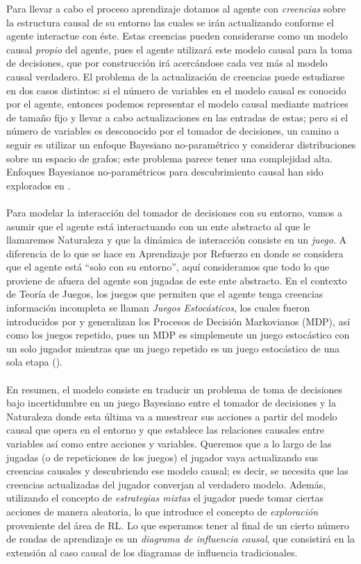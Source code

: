 \documentclass[11pt]{article}
\theoremstyle{plain}
\begin{document}
\indent Para llevar a cabo el proceso aprendizaje dotamos al agente con  \textit{creencias} sobre la estructura causal de su entorno las cuales se irán actualizando conforme el agente interactue con éste. Estas creencias pueden considerarse como un modelo causal \textit{propio} del agente, pues el agente utilizará este modelo causal para la toma de decisiones, que por construcción irá acercándose cada vez más al modelo causal verdadero. El problema de la actualización de creencias puede estudiarse en dos casos distintos: si el número de variables en el modelo causal es conocido por el agente, entonces podemos representar el modelo causal mediante matrices de tamaño fijo y llevar a cabo actualizaciones en las entradas de estas; pero si el número de variables es desconocido por el tomador de decisiones, un camino a seguir es utilizar un enfoque Bayesiano no-paramétrico y considerar distribuciones sobre un espacio de grafos; este problema parece tener una complejidad alta. Enfoques Bayesianos no-paramétricos para descubrimiento causal han sido explorados en \cite{karabatsos2012bayesian}.\\
\\
\indent Para modelar la interacción del tomador de decisiones con su entorno, vamos a asumir que el agente está interactuando con un ente abstracto al que le llamaremos Naturaleza y que la dinámica de interacción consiste en un \textit{juego}. A diferencia de lo que se hace en Aprendizaje por Refuerzo en donde se considera que el agente está “solo con su entorno”, aquí consideramos que todo lo que proviene de afuera del agente son jugadas de este ente abstracto. En el contexto de Teoría de Juegos, los juegos que permiten que el agente tenga creencias información incompleta se llaman \textit{Juegos Estocásticos}, los cuales fueron introducidos por \cite{shapley1953stochastic} y generalizan los Procesos de Decisión Markovianos (MDP), así como los juegos repetido, pues un MDP es simplemente un juego estocástico con un solo jugador mientras que un juego repetido es un juego estocástico de una sola etapa (\cite{shoham2008multiagent}).\\
\\
\indent En resumen, el modelo consiste en traducir un problema de toma de decisiones bajo incertidumbre en un juego Bayesiano entre el tomador de decisiones y la Naturaleza donde esta última va a muestrear sus acciones a partir del modelo causal que opera en el entorno y que establece las relaciones causales entre variables así como entre acciones y variables. Queremos que a lo largo de las jugadas (o de repeticiones de los juegos) el jugador vaya actualizando sus creencias causales y descubriendo ese modelo causal; es decir, se necesita que las creencias actualizadas del jugador converjan al verdadero modelo. Además, utilizando el concepto de \textit{estrategias mixtas} el jugador puede tomar ciertas acciones de manera aleatoria, lo que introduce el concepto de \textit{exploración} proveniente del área de RL. Lo que esperamos tener al final de un cierto número de rondas de aprendizaje es un \textit{diagrama de influencia causal}, que consistirá en la extensión al caso causal de los diagramas de influencia tradicionales.\\
\end{document}
